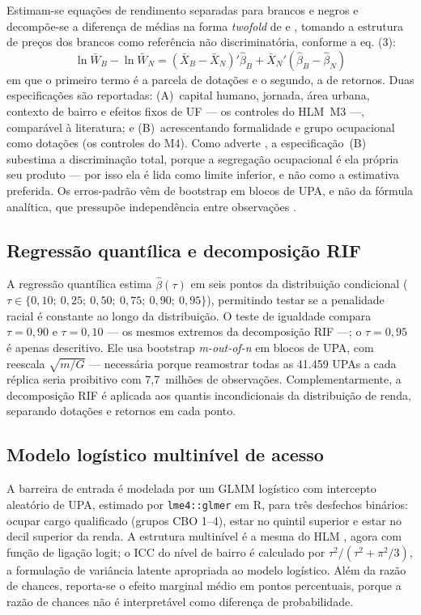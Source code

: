 \documentclass[12pt, a4paper, oneside]{article}
\let\oldsubsectionFB\subsection
\renewcommand{\subsection}{\FloatBarrier\oldsubsectionFB}
\begin{document}
Estimam-se equações de rendimento separadas para brancos e negros e
decompõe-se a diferença de médias na forma \emph{twofold} de
 e , tomando a estrutura de preços dos brancos como
referência não discriminatória, conforme a eq. (3):
\begin{equation}
\ln \bar W_B - \ln \bar W_N = (\bar X_B - \bar X_N)'\hat\beta_B +
\bar X_N'(\hat\beta_B - \hat\beta_N)
\end{equation}
em que o primeiro termo é a parcela de
dotações e o segundo, a de retornos. Duas especificações são reportadas:
(A)~capital humano, jornada, área urbana, contexto de bairro e efeitos fixos de UF ---
os controles do HLM~M3 ---, comparável à literatura; e (B)~acrescentando formalidade e
grupo ocupacional como dotações (os controles do M4). Como
adverte , a especificação~(B) subestima a
discriminação total, porque a segregação ocupacional é ela própria seu
produto --- por isso ela é lida como limite inferior, e não como a estimativa
preferida. Os erros-padrão vêm de bootstrap em blocos de UPA, e não da fórmula
analítica, que pressupõe independência entre observações \cite{cameron2008}.

\subsection{Regressão quantílica e decomposição RIF}

A regressão quantílica \cite{koenker1978} estima $\hat\beta(\tau)$ em seis
pontos da distribuição condicional ($\tau \in \{0{,}10;\ 0{,}25;\ 0{,}50;\
0{,}75;\ 0{,}90;\ 0{,}95\}$), permitindo testar se a penalidade racial é constante ao
longo da distribuição. O teste de igualdade compara $\tau = 0{,}90$ e $\tau = 0{,}10$
--- os mesmos extremos da decomposição RIF ---; o $\tau = 0{,}95$ é apenas descritivo. Ele usa
bootstrap \emph{m-out-of-n} em blocos de UPA, com reescala $\sqrt{m/G}$
\cite{bickel2008} --- necessária porque reamostrar todas as 41.459 UPAs a cada
réplica seria proibitivo com 7{,}7~milhões de observações.
Complementarmente, a decomposição RIF \cite{firpo2018} é aplicada aos quantis
incondicionais da distribuição de renda, separando dotações e retornos em cada
ponto.

\subsection{Modelo logístico multinível de acesso}

A barreira de entrada é modelada por um GLMM logístico com intercepto
aleatório de UPA, estimado por \texttt{lme4::glmer} em R, para três desfechos
binários: ocupar cargo qualificado (grupos CBO 1--4), estar no quintil superior
e estar no decil superior da renda. A estrutura multinível é a mesma do HLM
\cite{raudenbush2002}, agora com função de ligação logit; o ICC do nível de
bairro é calculado por $\tau^2/(\tau^2 + \pi^2/3)$, a formulação de variância
latente apropriada ao modelo logístico. Além da razão de chances, reporta-se o
efeito marginal médio em pontos percentuais, porque a razão de chances não é
interpretável como diferença de probabilidade.
\end{document}
